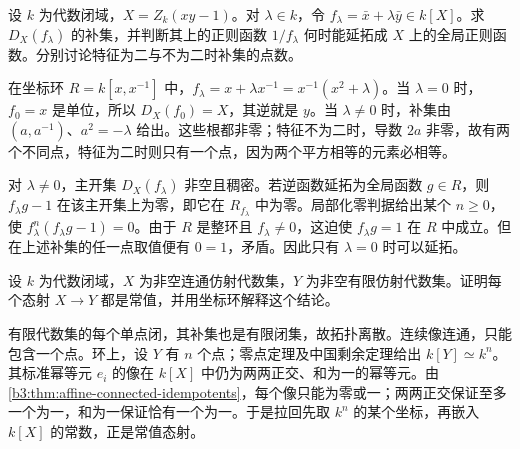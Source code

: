 \begin{exercise}\label{b3:ex:07-regular-denominators}
	设 \(k\) 为代数闭域，\(X=Z_k(xy-1)\)。对 \(\lambda\in k\)，令 \(f_\lambda=\bar x+\lambda\bar y\in k[X]\)。求 \(D_X(f_\lambda)\) 的补集，并判断其上的正则函数 \(1/f_\lambda\) 何时能延拓成 \(X\) 上的全局正则函数。分别讨论特征为二与不为二时补集的点数。
\end{exercise}
\begin{solution}
	在坐标环 \(R=k[x,x^{-1}]\) 中，\(f_\lambda=x+\lambda x^{-1}=x^{-1}(x^2+\lambda)\)。当 \(\lambda=0\) 时，\(f_0=x\) 是单位，所以 \(D_X(f_0)=X\)，其逆就是 \(y\)。当 \(\lambda\ne0\) 时，补集由 \((a,a^{-1})\)、\(a^2=-\lambda\) 给出。这些根都非零；特征不为二时，导数 \(2a\) 非零，故有两个不同点，特征为二时则只有一个点，因为两个平方相等的元素必相等。

	对 \(\lambda\ne0\)，主开集 \(D_X(f_\lambda)\) 非空且稠密。若逆函数延拓为全局函数 \(g\in R\)，则 \(f_\lambda g-1\) 在该主开集上为零，即它在 \(R_{f_\lambda}\) 中为零。局部化零判据给出某个 \(n\ge0\)，使 \(f_\lambda^n(f_\lambda g-1)=0\)。由于 \(R\) 是整环且 \(f_\lambda\ne0\)，这迫使 \(f_\lambda g=1\) 在 \(R\) 中成立。但在上述补集的任一点取值便有 \(0=1\)，矛盾。因此只有 \(\lambda=0\) 时可以延拓。
\end{solution}

\begin{exercise}\label{b3:ex:07-connected-to-finite}
	设 \(k\) 为代数闭域，\(X\) 为非空连通仿射代数集，\(Y\) 为非空有限仿射代数集。证明每个态射 \(X\to Y\) 都是常值，并用坐标环解释这个结论。
\end{exercise}
\begin{solution}
	有限代数集的每个单点闭，其补集也是有限闭集，故拓扑离散。连续像连通，只能包含一个点。环上，设 \(Y\) 有 \(n\) 个点；零点定理及中国剩余定理给出 \(k[Y]\simeq k^n\)。其标准幂等元 \(e_i\) 的像在 \(k[X]\) 中仍为两两正交、和为一的幂等元。由\cref{b3:thm:affine-connected-idempotents}，每个像只能为零或一；两两正交保证至多一个为一，和为一保证恰有一个为一。于是拉回先取 \(k^n\) 的某个坐标，再嵌入 \(k[X]\) 的常数，正是常值态射。
\end{solution}
